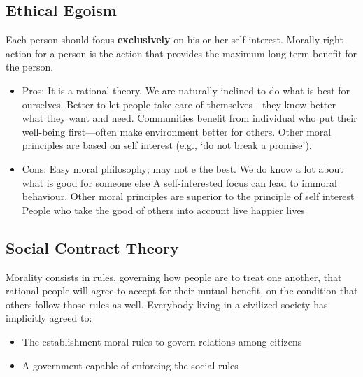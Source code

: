 \documentclass{article}
\begin{document}
\pagebreak

\subsection{Ethical Egoism}
\begin{flushleft}
Each person should focus \textbf{exclusively} on his or her self interest. Morally right action for a person is the action that provides the maximum long-term benefit for the person.
\end{flushleft}
\begin{itemize}
  \item Pros: It is a rational theory. We are naturally inclined to do what is best for ourselves. Better to let people take care of themselves—they know better what they want and need. Communities benefit from individual who put their well-being first—often make environment better for others. Other moral principles are based on self interest (e.g., ‘do not break a promise’).
  \item Cons: Easy moral philosophy; may not e the best. We do know a lot about what is good for someone else A self-interested focus can lead to immoral behaviour. Other moral principles are superior to the principle of self interest People who take the good of others into account live happier lives
\end{itemize}

\subsection{Social Contract Theory}
\begin{flushleft}
Morality consists in rules, governing how people are to treat one another, that rational people will agree to accept for their mutual benefit, on the condition that others follow those rules as well. Everybody living in a civilized society has implicitly agreed to:
\begin{itemize}
  \item The establishment moral rules to govern relations among citizens 
  \item A government capable of enforcing the social rules
\end{itemize}
\end{flushleft}
\end{document}
